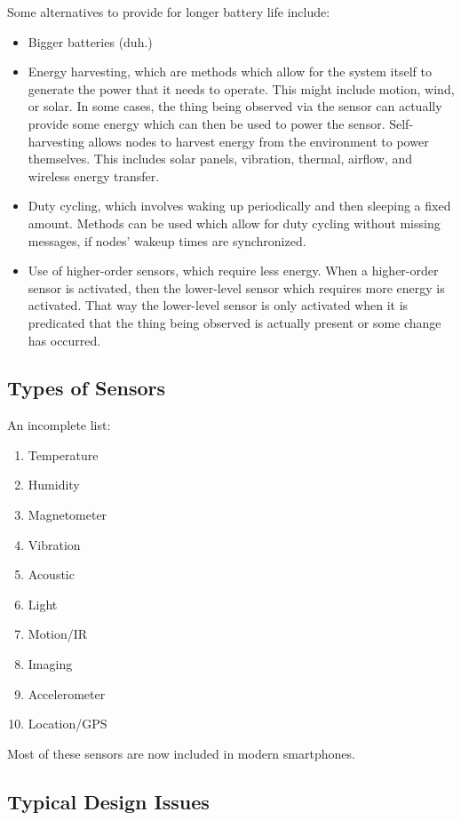 \documentclass[twoside]{article}
\begin{document}
Some alternatives to provide for longer battery life include:
\begin{itemize}
  \item Bigger batteries (duh.)
  \item Energy harvesting, which are methods which allow for the system itself to generate the power that it needs to operate. This might include motion, wind, or solar. In some cases, the thing being observed via the sensor can actually provide some energy which can then be used to power the sensor. Self-harvesting allows nodes to harvest energy from the environment to power themselves. This includes solar panels, vibration, thermal, airflow, and wireless energy transfer.
  \item Duty cycling, which involves waking up periodically and then sleeping a fixed amount. Methods can be used which allow for duty cycling without missing messages, if nodes' wakeup times are synchronized.
  \item Use of higher-order sensors, which require less energy. When a higher-order sensor is activated, then the lower-level sensor which requires more energy is activated. That way the lower-level sensor is only activated when it is predicated that the thing being observed is actually present or some change has occurred.
\end{itemize}

\subsection{Types of Sensors}
An incomplete list:
\begin{enumerate}
  \item Temperature
  \item Humidity
  \item Magnetometer
  \item Vibration
  \item Acoustic
  \item Light
  \item Motion/IR
  \item Imaging
  \item Accelerometer
  \item Location/GPS
\end{enumerate}

Most of these sensors are now included in modern smartphones.


\subsection{Typical Design Issues}
\end{document}
